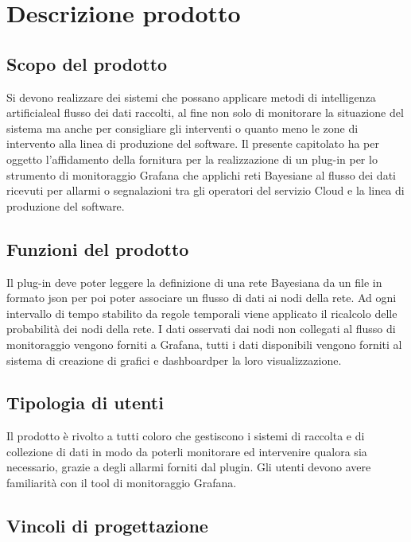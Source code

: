 \section{Descrizione prodotto}
		\subsection{Scopo del prodotto}			
Si devono realizzare dei sistemi che possano applicare metodi di intelligenza artificiale\pedice al flusso dei dati raccolti, al fine non solo di monitorare la situazione del sistema ma anche per consigliare gli interventi o quanto meno le zone di intervento alla linea di produzione del software.
Il presente capitolato ha per oggetto l'affidamento della fornitura per la
realizzazione di un plug-in per lo strumento di monitoraggio Grafana che
applichi reti Bayesiane al flusso dei dati ricevuti per allarmi o segnalazioni tra gli operatori del servizio Cloud e la linea di produzione del software.


		\subsection{Funzioni del prodotto}
Il plug-in deve poter leggere la definizione di una rete Bayesiana da un file in formato json per poi poter associare un flusso di dati ai nodi della rete. Ad ogni intervallo di tempo stabilito da regole temporali viene applicato il ricalcolo delle probabilità dei nodi della rete. I dati osservati dai nodi non collegati al flusso di monitoraggio vengono forniti a Grafana, tutti i dati disponibili vengono forniti al sistema di creazione di grafici e dashboard\pedice per la loro visualizzazione.


		\subsection{Tipologia di utenti}

Il prodotto è rivolto a tutti coloro che gestiscono i sistemi di raccolta e
di collezione di dati in modo da poterli monitorare ed intervenire qualora sia
necessario, grazie a degli allarmi forniti dal plugin.
Gli utenti devono avere familiarità  con il tool di monitoraggio Grafana.


		\subsection{Vincoli di progettazione}
